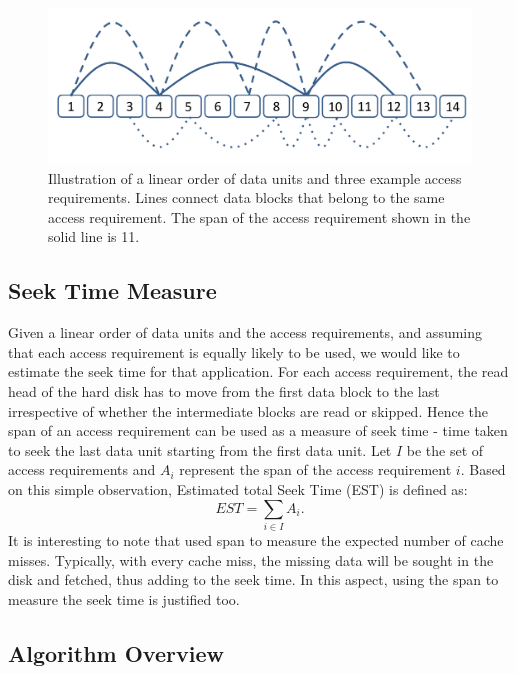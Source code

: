 \begin{figure}[t]
\centering
\includegraphics[width=\columnwidth]{AccessReqsFigure.pdf}
\caption{Illustration of a linear order of data units and three example access
requirements.  Lines connect data blocks that belong to the same access
requirement.  The span of the access requirement shown in the solid line is 11.
}
\label{singleAR}
\end{figure}



\subsection{Seek Time Measure}
Given a linear order of data units and the access requirements, and assuming
that each access requirement is equally likely to be used, we would like to
estimate the seek time for that application.  For each access requirement, the
read head of the hard disk has to move from the first data block to the last
irrespective of whether the intermediate blocks are read or skipped. Hence the
span of an access requirement can be used as a measure of seek time - time
taken to seek the last data unit starting from the first data unit.  Let $I$ be
the set of access requirements and $A_i$ represent the span of the access
requirement $i$.
Based on this simple observation, Estimated total Seek Time (EST) is defined as:
\[
EST = \sum_{i \in I}{A_i}.
\]
It is interesting to note that \cite{cacheobliviouslayout}
used span to measure the expected number of cache misses.  Typically, with
every cache miss, the missing data will be sought in the disk and fetched, thus
adding to the seek time. In this aspect, using the span to measure the seek time is
justified too.


\subsection{Algorithm Overview}

